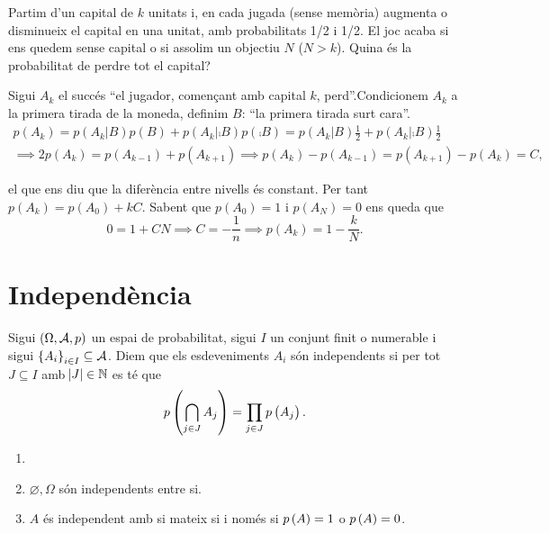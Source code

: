 \begin{problema}
    Partim d'un capital de $k$ unitats i, en cada jugada (sense memòria) augmenta o disminueix el capital en una unitat,
    amb probabilitats 1/2 i 1/2. El joc acaba si ens quedem sense capital o si assolim un objectiu $N$ ($N>k$).
    Quina és la probabilitat de perdre tot el capital?
\end{problema}
\begin{sol}
    Sigui $A_k$ el succés ``el jugador, començant amb capital $k$, perd''.Condicionem $A_k$ a la primera tirada de la moneda, 
    definim $B$: ``la primera tirada surt cara''.
    \begin{gather*}
      p(A_k) = p(A_k|B)p(B) + p(A_k|\comp{B})p(\comp{B}) = p(A_k|B)\frac{1}{2} + p(A_k|\comp{B})\frac{1}{2}\\
      \implies 2p(A_k)=p(A_{k-1}) + p(A_{k+1}) \implies p(A_k) - p(A_{k-1}) = p(A_{k+1}) - p(A_k) = C,
    \end{gather*}

    el que ens diu que la diferència entre nivells és constant. Per tant $p(A_k) = p(A_0)+kC$. Sabent que $p(A_0)=1$ i $p(A_N)=0$ ens queda que
    \[0 = 1 + CN \implies C = -\frac{1}{n} \implies p(A_k) = 1 - \frac{k}{N}.\]
\end{sol}


\section{Independència}

\begin{defi}
    Sigui $\left( \Omega, \mathcal{A}, p\right)$ un espai de probabilitat, sigui $I$ un conjunt finit o numerable i sigui $\left\{ A_i\right\}_{i\in I} \subseteq \mathcal{A}$. Diem que els esdeveniments $A_i$ són independents si per tot $J\subseteq I$ amb $\abs{J}\in\mathbb{N}$ es té que
    \[
        p\left(\bigcap_{j\in J} A_j\right) = \prod_{j\in J} p\left( A_j\right).
    \]
\end{defi}

\begin{example}
    \begin{enumerate}[1.]
        \item[]
        \item $\varnothing, \Omega$ són independents entre si.
        \item $A$ és independent amb si mateix si i només si $p\left( A\right)=1$ o $p\left( A\right) =0$.
    \end{enumerate}
\end{example}

